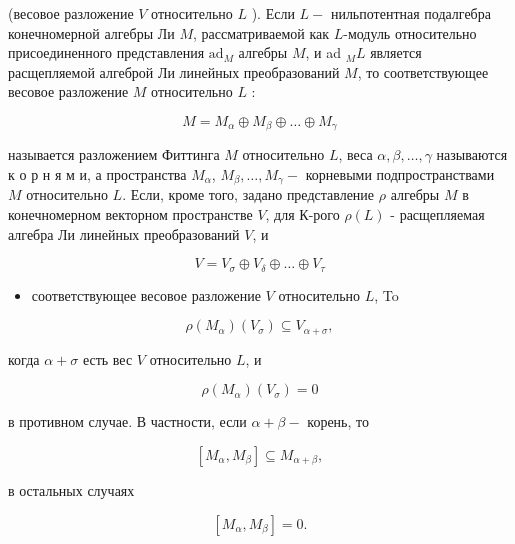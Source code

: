 \documentclass[10pt]{article}
\begin{document}
(весовое разложение $V$ относительно $L$ ). Если $L-$ нильпотентная подалгебра конечномерной алгебры Ли $M$, рассматриваемой как $L$-модуль относительно присоединенного представления $\mathrm{ad}_{M}$ алгебры $M$, и ad $_{M} L$ является расщепляемой алгеброй Ли линейных преобразований $M$, то соответствующее весовое разложение $M$ относительно $L$ :



\[

M=M_{\alpha} \oplus M_{\beta} \oplus \ldots \oplus M_{\gamma}

\]



называется разложением Фиттинга $M$ относительно $L$, веса $\alpha, \beta, \ldots, \gamma$ называются к о р н я м и, а пространства $M_{\alpha}$, $M_{\beta}, \ldots, M_{\gamma}-$ корневыми подпространствами $M$ относительно $L$. Если, кроме того, задано представление $\rho$ алгебры $M$ в конечномерном векторном пространстве $V$, для К-рого $\rho(L)$ - расщепляемая алгебра Ли линейных преобразований $V$, и



\[

V=V_{\sigma} \oplus V_{\delta} \oplus \ldots \oplus V_{\tau}

\]



\begin{itemize}

  \item соответствующее весовое разложение $V$ относительно $L$, To

\end{itemize}



\[

\rho\left(M_{\alpha}\right)\left(V_{\sigma}\right) \subseteq V_{\alpha+\sigma},

\]



когда $\alpha+\sigma$ есть вес $V$ относительно $L$, и



\[

\rho\left(M_{\alpha}\right)\left(V_{\sigma}\right)=0

\]



в противном случае. В частности, если $\alpha+\beta-$ корень, то



\[

\left[M_{\alpha}, M_{\beta}\right] \subseteq M_{\alpha+\beta},

\]



в остальных случаях



\[

\left[M_{\alpha}, M_{\beta}\right]=0 .

\]
\end{document}
